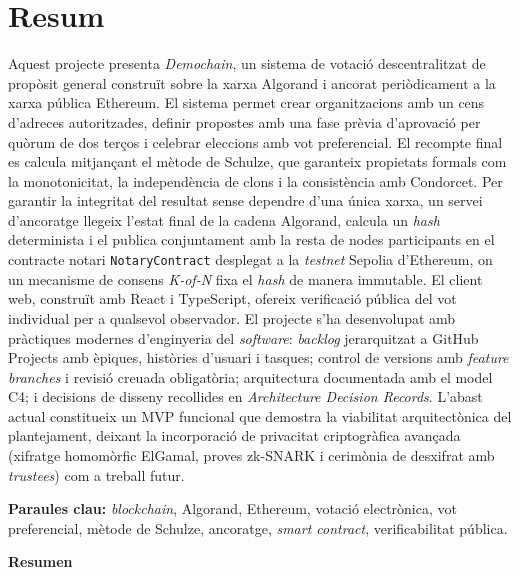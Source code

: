 


\chapter*{Resum}
 

Aquest projecte presenta \emph{Demochain}, un sistema de votació descentralitzat de propòsit general construït sobre la
xarxa Algorand i ancorat periòdicament a la xarxa pública Ethereum.
El sistema permet crear organitzacions amb un cens d'adreces autoritzades, definir propostes amb una fase prèvia
d'aprovació per quòrum de dos terços i celebrar eleccions amb vot preferencial.
El recompte final es calcula mitjançant el mètode de Schulze, que garanteix propietats formals com la monotonicitat, la
independència de clons i la consistència amb Condorcet.
Per garantir la integritat del resultat sense dependre d'una única xarxa, un servei d'ancoratge llegeix l'estat final de
la cadena Algorand, calcula un \textit{hash} determinista i el publica conjuntament amb la resta de nodes participants en
el contracte notari \texttt{NotaryContract} desplegat a la \emph{testnet} Sepolia d'Ethereum, on un mecanisme de consens
\textit{K-of-N} fixa el \textit{hash} de manera immutable.
El client web, construït amb React i TypeScript, ofereix verificació pública del vot individual per a qualsevol
observador.
El projecte s'ha desenvolupat amb pràctiques modernes d'enginyeria del \textit{software}: \emph{backlog} jerarquitzat a
GitHub Projects amb èpiques, històries d'usuari i tasques; control de versions amb \emph{feature branches} i revisió
creuada obligatòria; arquitectura documentada amb el model C4; i decisions de disseny recollides en
\emph{Architecture Decision Records}.
L'abast actual constitueix un \ac{MVP} funcional que demostra la viabilitat arquitectònica del plantejament, deixant la
incorporació de privacitat criptogràfica avançada (xifratge homomòrfic ElGamal, proves zk-SNARK i cerimònia de desxifrat
amb \emph{trustees}) com a treball futur.

\textbf{Paraules clau:} \emph{blockchain}, Algorand, Ethereum, votació electrònica, vot preferencial, mètode de Schulze,
ancoratge, \emph{smart contract}, verificabilitat pública.

\vspace{1cm}
\begin{center}
    \textbf{\Large Resumen}
\end{center}
\vspace{0.5cm}

